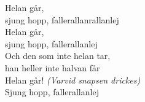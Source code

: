 \vspace{10pt}
Helan går,\\
sjung hopp, fallerallanrallanlej\\
Helan går,\\
sjung hopp, fallerallanlej\\
Och den som inte helan tar,\\
han heller inte halvan får\\
Helan går! \textit{(Varvid snapsen drickes)}\\
Sjung hopp, fallerallanlej
